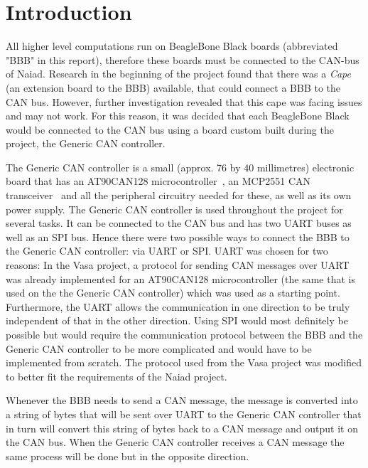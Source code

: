 
\section{Introduction}\label{sec:introduction}
All higher level computations run on BeagleBone Black boards (abbreviated "BBB" in this report), therefore these boards must be connected to the CAN-bus of Naiad. Research in the beginning of the project found that there was a \emph{Cape} (an extension board to the BBB) available, that could connect a BBB to the CAN bus. However, further investigation revealed that this cape was facing issues and may not work. For this reason, it was decided that each BeagleBone Black would be connected to the CAN bus using a board custom built during the project, the Generic CAN controller. \newline

The Generic CAN controller is a small (approx. 76 by 40 millimetres) electronic board that has an AT90CAN128 microcontroller~\cite{web:at90can}, an MCP2551 CAN transceiver~\cite{web:mcp2551} and all the peripheral circuitry needed for these, as well as its own power supply. The Generic CAN controller is used throughout the project for several tasks. It can be connected to the CAN bus and has two UART buses as well as an SPI bus. \newline
Hence there were two possible ways to connect the BBB to the Generic CAN controller: via UART or SPI. \newline
UART was chosen for two reasons: In the Vasa project, a protocol for sending CAN messages over UART was already implemented for an AT90CAN128 microcontroller (the same that is used on the the Generic CAN controller) which was used as a starting point. Furthermore, the UART allows the communication in one direction to be truly independent of that in the other direction. Using SPI would most definitely be possible but would require the communication protocol between the BBB and the Generic CAN controller to be more complicated and would have to be implemented from scratch.  \newline
The protocol used from the Vasa project was modified to better fit the requirements of the Naiad project.

Whenever the BBB needs to send a CAN message, the message is converted into a string of bytes that will be sent over UART to the Generic CAN controller that in turn will convert this string of bytes back to a CAN message and output it on the CAN bus. When the Generic CAN controller receives a CAN message the same process will be done but in the opposite direction. 
